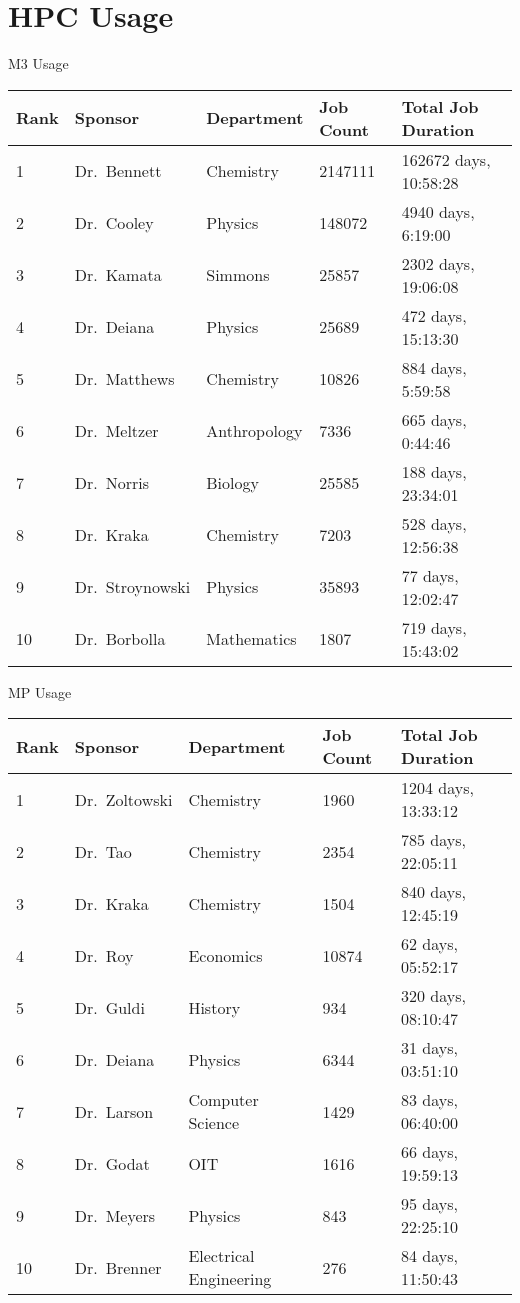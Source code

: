 \section{HPC Usage}

\begin{frame}{M3 Usage}
\begin{table}
\scriptsize
\begin{tabular}{lllll}
\toprule
Rank & Sponsor & Department & Job Count & Total Job Duration \\
\midrule
1 & Dr.\ Bennett & Chemistry & 2147111 & 162672 days, 10:58:28 \\
2 & Dr.\ Cooley & Physics & 148072 & 4940 days, 6:19:00 \\
3 & Dr.\ Kamata & Simmons & 25857 & 2302 days, 19:06:08 \\
4 & Dr.\ Deiana & Physics & 25689 & 472 days, 15:13:30 \\
5 & Dr.\ Matthews & Chemistry & 10826 & 884 days, 5:59:58 \\
6 & Dr.\ Meltzer & Anthropology & 7336 & 665 days, 0:44:46 \\
7 & Dr.\ Norris & Biology & 25585 & 188 days, 23:34:01 \\
8 & Dr.\ Kraka & Chemistry & 7203 & 528 days, 12:56:38 \\
9 & Dr.\ Stroynowski & Physics & 35893 & 77 days, 12:02:47 \\
10 & Dr.\ Borbolla & Mathematics & 1807 & 719 days, 15:43:02 \\
\bottomrule
\end{tabular}
\end{table}
\end{frame}

\begin{frame}{MP Usage}
\begin{table}
\scriptsize
\begin{tabular}{lllll}
\toprule
Rank & Sponsor & Department & Job Count & Total Job Duration \\
\midrule
1 & Dr.\ Zoltowski & Chemistry & 1960 & 1204 days, 13:33:12 \\
2 & Dr.\ Tao & Chemistry  & 2354 & 785 days, 22:05:11 \\
3 & Dr.\ Kraka & Chemistry & 1504 & 840 days, 12:45:19 \\
4 & Dr.\ Roy & Economics & 10874 & 62 days, 05:52:17 \\
5 & Dr.\ Guldi & History & 934 & 320 days, 08:10:47 \\
6 & Dr.\ Deiana & Physics & 6344 & 31 days, 03:51:10 \\
7 & Dr.\ Larson & Computer Science & 1429 & 83 days, 06:40:00 \\
8 & Dr.\ Godat & OIT & 1616 & 66 days, 19:59:13 \\
9 & Dr.\ Meyers & Physics & 843 & 95 days, 22:25:10 \\
10 & Dr.\ Brenner & Electrical Engineering & 276 & 84 days, 11:50:43 \\
\bottomrule
\end{tabular}
\end{table}
\end{frame}


